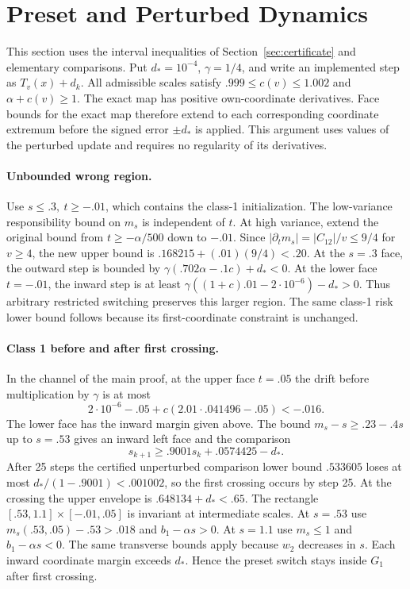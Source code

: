 \section{Preset and Perturbed Dynamics}\label{sec:stability_proof}
This section uses the interval inequalities of Section~\ref{sec:certificate} and elementary comparisons. Put $d_*=10^{-4}$, $\gamma=1/4$, and write an implemented step as $T_v(x)+d_k$. All admissible scales satisfy $.999\le c(v)\le1.002$ and $\alpha+c(v)\ge1$. The exact map has positive own-coordinate derivatives. Face bounds for the exact map therefore extend to each corresponding coordinate extremum before the signed error $\pm d_*$ is applied. This argument uses values of the perturbed update and requires no regularity of its derivatives.

\paragraph{Unbounded wrong region.}
Use $s\le.3,\ t\ge-.01$, which contains the class-1 initialization. The low-variance responsibility bound on $m_s$ is independent of $t$. At high variance, extend the original bound from $t\ge-\alpha/500$ down to $-.01$. Since $|\partial_t m_s|=|C_{12}|/v\le9/4$ for $v\ge4$, the new upper bound is $.168215+(.01)(9/4)<.20$. At the $s=.3$ face, the outward step is bounded by $\gamma(.702\alpha-.1c)+d_*<0$. At the lower face $t=-.01$, the inward step is at least $\gamma((1+c).01-2\cdot10^{-6})-d_*>0$. Thus arbitrary restricted switching preserves this larger region. The same class-1 risk lower bound follows because its first-coordinate constraint is unchanged.

\paragraph{Class 1 before and after first crossing.}
In the channel of the main proof, at the upper face $t=.05$ the drift before multiplication by $\gamma$ is at most
\[
2\cdot10^{-6}-.05+c(2.01\cdot.041496-.05)<-.016.
\]
The lower face has the inward margin given above. The bound $m_s-s\ge.23-.4s$ up to $s=.53$ gives an inward left face and the comparison
\[
s_{k+1}\ge .9001s_k+.0574425-d_* .
\]
After 25 steps the certified unperturbed comparison lower bound $.533605$ loses at most $d_* /(1-.9001)<.001002$, so the first crossing occurs by step 25. At the crossing the upper envelope is $.648134+d_*<.65$. The rectangle $[.53,1.1]\times[-.01,.05]$ is invariant at intermediate scales. At $s=.53$ use $m_s(.53,.05)-.53>.018$ and $b_1-\alpha s>0$. At $s=1.1$ use $m_s\le1$ and $b_1-\alpha s<0$. The same transverse bounds apply because $w_2$ decreases in $s$. Each inward coordinate margin exceeds $d_*$. Hence the preset switch stays inside $G_1$ after first crossing.

